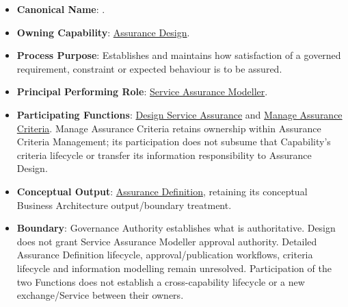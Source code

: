\begin{itemize}

\item 
\textbf{Canonical Name}: \texttt{}.



\item 
\textbf{Owning Capability}: \hyperref[rad:enabling:680]{Assurance Design}.



\item 
\textbf{Process Purpose}: Establishes and maintains how satisfaction of a governed requirement, constraint or expected behaviour is to be assured.



\item 
\textbf{Principal Performing Role}: \href{https://github.com/fhirfactory/harmonia/blob/98410db60155198a75f74c79d98060070209faa1/docs/markdown/03-business-architecture/actors-roles/roles.md\#service-assurance-modeller}{Service Assurance Modeller}.



\item 
\textbf{Participating Functions}: \hyperref[rad:assurance:71]{Design Service Assurance} and \hyperref[rad:assurance:84]{Manage Assurance Criteria}. Manage Assurance Criteria retains ownership within Assurance Criteria Management; its participation does not subsume that Capability's criteria lifecycle or transfer its information responsibility to Assurance Design.



\item 
\textbf{Conceptual Output}: \hyperref[rad:assurance:150]{Assurance Definition}, retaining its conceptual Business Architecture output/\allowbreak{}boundary treatment.



\item 
\textbf{Boundary}: Governance Authority establishes what is authoritative. Design does not grant Service Assurance Modeller approval authority. Detailed Assurance Definition lifecycle, approval/\allowbreak{}publication workflows, criteria lifecycle and information modelling remain unresolved. Participation of the two Functions does not establish a cross-capability lifecycle or a new exchange/\allowbreak{}Service between their owners.



\end{itemize}
\label{rad:processes:365}



